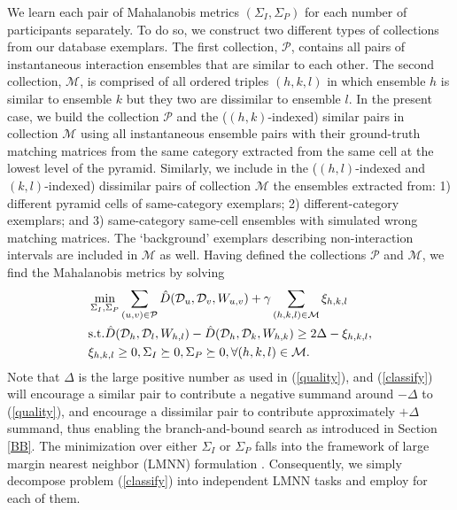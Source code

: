 We learn each pair of Mahalanobis metrics $(\Sigma_{I}, \Sigma_{P})$ for each number of participants separately. To do so, we construct two different types of collections from our database exemplars. The first collection, $\mathcal{P}$, contains all pairs of instantaneous interaction ensembles that are similar to each other. The second collection, $\mathcal{M}$, is comprised of all ordered triples $(h,k,l)$ in which ensemble $h$ is similar to ensemble $k$ but they two  are dissimilar to ensemble $l$. In the present case, we build the collection $\mathcal{P}$ and the ($(h,k)$-indexed) similar pairs in collection $\mathcal{M}$ using all instantaneous ensemble pairs with their ground-truth matching matrices from the same category extracted from the same cell at the lowest level of the pyramid. Similarly, we include in the ($(h,l)$-indexed and $(k,l)$-indexed) dissimilar pairs  of collection $\mathcal{M}$ the ensembles extracted from: 1) different pyramid cells of same-category exemplars; 2) different-category exemplars; and 3) same-category same-cell ensembles with simulated wrong matching matrices. The `background' exemplars describing non-interaction intervals are included in $\mathcal{M}$ as well. Having defined the collections $\mathcal{P}$ and $\mathcal{M}$, we find the Mahalanobis metrics by solving
\begin{equation}
\label{classify}
\begin{split}
&\min_{\Sigma_{I},\Sigma_{P}} \sum_{(u,v)\in\mathcal{P}}\hat{D}(\mathcal{D}_{u}, \mathcal{D}_{v}, W_{u,v})+\gamma\sum_{(h,k,l)\in\mathcal{M}}\xi_{h,k,l}\\
&\textup{s.t.}  \hat{D}(\mathcal{D}_{h}, \mathcal{D}_{l}, W_{h,l})-\hat{D}(\mathcal{D}_{h}, \mathcal{D}_{k}, W_{h,k})\ge 2\Delta-\xi_{h,k,l}, \\
&\xi_{h,k,l}\ge0, \Sigma_{I}\succeq 0, \Sigma_{P}\succeq 0, \forall (h,k,l)\in\mathcal{M}.
\end{split}
\end{equation}
Note that $\Delta$ is the large positive number as used in (\ref{quality}), and (\ref{classify}) will encourage a similar pair to contribute a negative summand around $-\Delta$ to (\ref{quality}), and encourage a dissimilar pair to contribute approximately $+\Delta$ summand,  thus enabling the branch-and-bound search as introduced in Section \ref{BB}.  The minimization over either $\Sigma_{I}$ or $\Sigma_{P}$ falls into the framework of large margin nearest neighbor (LMNN) formulation \cite{Weinberger:ML}. Consequently, we simply decompose problem (\ref{classify}) into independent LMNN tasks and employ \cite{Weinberger:ML} for each of them.

